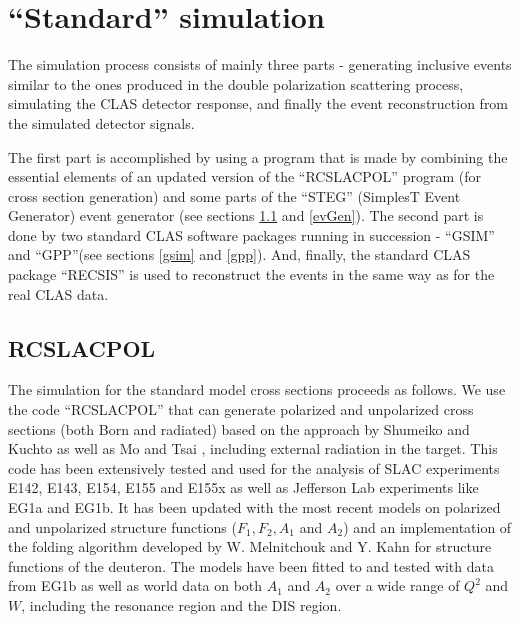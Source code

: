 
\hspace{0.5cm}


\section{``Standard'' simulation}
\label{stand}

The simulation process consists of mainly three parts - generating inclusive events similar to the ones %
produced in the double polarization scattering process, simulating the CLAS detector response, and finally the event reconstruction from %
the simulated detector signals.

The first part is accomplished by using a program that is made by combining the essential elements of an updated version of the ``RCSLACPOL'' program (for cross section generation) and some parts of the ``STEG'' (SimplesT Event Generator) event generator (see sections \ref{rcslacpol} and \ref{evGen}). The second part is done by two standard CLAS software packages running in succession - ``GSIM'' and ``GPP''(see sections \ref{gsim} and \ref{gpp}). And, finally, the %
standard CLAS package ``RECSIS'' is used to reconstruct the events in the same way as for the real CLAS data.


\subsection{RCSLACPOL}
\label{rcslacpol}
The simulation for the standard model cross sections %
proceeds as follows. We use the code ``RCSLACPOL'' \cite{PolNit:ref} %
that can generate polarized and unpolarized cross sections (both Born and radiated) based on the %
approach by Shumeiko and Kuchto \cite{Kuchto:ref} as well as Mo and Tsai \cite{MoTsai:ref}, including external radiation in the target. This code has been extensively tested and used for the analysis of SLAC experiments E142, E143, E154, E155 and E155x %
as well as Jefferson Lab experiments like EG1a and EG1b. %
It has been updated with the most recent models on polarized and unpolarized structure functions ($F_1, F_2, A_1$ and $A_2$) \cite{Bosted:2007xd,PolNit:ref,EG1bProt,EG1bDeut} %
and an implementation of the folding algorithm developed by W. Melnitchouk and Y. Kahn \cite{KahnEtal} for structure functions of the deuteron. The models have been fitted to and tested with data from EG1b as well as world data on both $A_1$ and $A_2$ over a wide range of $Q^2$ and $W$, including the resonance region and the DIS region.

